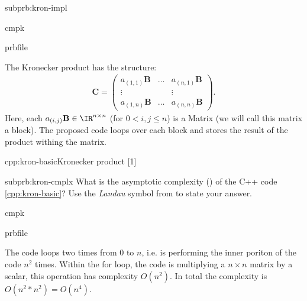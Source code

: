 \begin{samproblem}
\begin{subproblem}{subprb:kron-impl}
\begin{samwriteprbpart}{cmpk}
  \begin{writeverbatim}{prbfile}
    \begin{samsolution}
      The Kronecker product has the structure:
      \begin{align*}
        \mathbf{C} = \begin{pmatrix}
          a_{(1,1)} \mathbf{B} & \dots & a_{(n,1)} \mathbf{B} \\
          \vdots              &       & \vdots               \\
          a_{(1,n)} \mathbf{B} & \dots & a_{(n,n)} \mathbf{B}
          \end{pmatrix}.
      \end{align*}
      Here, each $a_{(i,j)} \mathbf{B} \in \IR^{n\times n}$
      (for $0 < i,j \leq n$) is a Matrix (we will call
      this matrix a block). The proposed code loops over each block and stores
      the result of the product withing the matrix.
      \begin{samcode}[C++11-code]{cpp:kron-basic}{Kronecker product}
        [1]
      \end{samcode}
    \end{samsolution}
  \end{writeverbatim}
\end{samwriteprbpart}
\end{subproblem}

\begin{subproblem}{subprb:kron-cmplx}
What is the asymptotic complexity ()
of the C++ code \ref{cpp:kron-basic}? Use the \emph{Landau} symbol
from  to state your answer.

\begin{samwriteprbpart}{cmpk}
  \begin{writeverbatim}{prbfile}
    \begin{samsolution}
      The code loops two times from $0$ to $n$, i.e. is performing the inner
      poriton of the code $n^2$ times.
      Within the for loop, the
      code is multiplying a $n \times n$ matrix by a scalar, this operation
      has complexity $O(n^2)$.
      In total the complexity is $O(n^2*n^2)=O(n^4)$.
      \end{samsolution}
    \end{writeverbatim}
  \end{samwriteprbpart}
\end{subproblem}


\end{samproblem}
